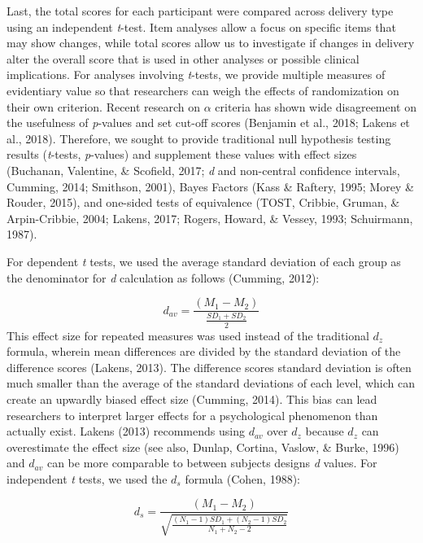 \documentclass[english,man, mask]{apa6}
\theoremstyle{definition}
\theoremstyle{definition}
\theoremstyle{definition}
\theoremstyle{remark}
\begin{document}
Last, the total scores for each participant were compared across
delivery type using an independent \emph{t}-test. Item analyses allow a
focus on specific items that may show changes, while total scores allow
us to investigate if changes in delivery alter the overall score that is
used in other analyses or possible clinical implications. For analyses
involving \emph{t}-tests, we provide multiple measures of evidentiary
value so that researchers can weigh the effects of randomization on
their own criterion. Recent research on \(\alpha\) criteria has shown
wide disagreement on the usefulness of \emph{p}-values and set cut-off
scores (Benjamin et al., 2018; Lakens et al., 2018). Therefore, we
sought to provide traditional null hypothesis testing results
(\emph{t}-tests, \emph{p}-values) and supplement these values with
effect sizes (Buchanan, Valentine, \& Scofield, 2017; \emph{d} and
non-central confidence intervals, Cumming, 2014; Smithson, 2001), Bayes
Factors (Kass \& Raftery, 1995; Morey \& Rouder, 2015), and one-sided
tests of equivalence (TOST, Cribbie, Gruman, \& Arpin-Cribbie, 2004;
Lakens, 2017; Rogers, Howard, \& Vessey, 1993; Schuirmann, 1987).

For dependent \emph{t} tests, we used the average standard deviation of
each group as the denominator for \emph{d} calculation as follows
(Cumming, 2012):

\[
d_{av} = \frac {(M_1 -  M_2) } { \frac{SD_1 + SD_2 } {2} }
\] This effect size for repeated measures was used instead of the
traditional \(d_z\) formula, wherein mean differences are divided by the
standard deviation of the difference scores (Lakens, 2013). The
difference scores standard deviation is often much smaller than the
average of the standard deviations of each level, which can create an
upwardly biased effect size (Cumming, 2014). This bias can lead
researchers to interpret larger effects for a psychological phenomenon
than actually exist. Lakens (2013) recommends using \(d_{av}\) over
\(d_z\) because \(d_z\) can overestimate the effect size (see also,
Dunlap, Cortina, Vaslow, \& Burke, 1996) and \(d_{av}\) can be more
comparable to between subjects designs \emph{d} values. For independent
\emph{t} tests, we used the \(d_s\) formula (Cohen, 1988):

\[
d_s = \frac {(M_1 -  M_2) } { \sqrt{\frac{(N_1-1)SD_1 + (N_2-1)SD_2 } {N_1+N_2-2}} }
\]
\end{document}
